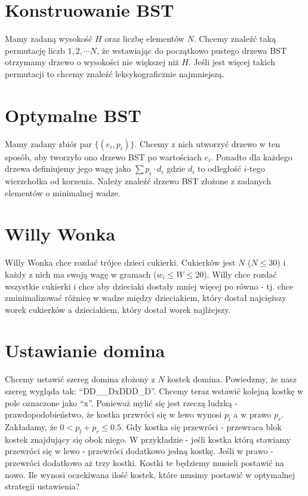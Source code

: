 \section*{Konstruowanie BST}

Mamy zadaną wysokość $H$ oraz liczbę elementów $N$.
Chcemy znaleźć taką permutację liczb $1, 2, \cdots N$, że wstawiając do początkowo pustego drzewa BST otrzymamy drzewo o wysokości nie większej niż $H$.
Jeśli jest więcej takich permutacji to chcemy znaleźć leksykograficznie najmniejszą.

\section*{Optymalne BST}

Mamy zadany zbiór par $\{(e_i, p_i)\}$.
Chcemy z nich utworzyć drzewo w ten sposób, aby tworzyło ono drzewo BST po wartościach $e_i$.
Ponadto dla każdego drzewa definiujemy jego wagę jako $\sum p_i \cdot d_i$ gdzie $d_i$ to odległość $i$-tego wierzchołka od korzenia.
Należy znaleźć drzewo BST złożone z zadanych elementów o minimalnej wadze.

\section*{Willy Wonka}

Willy Wonka chce rozdać trójce dzieci cukierki.
Cukierków jest $N$ ($N \leq 30$) i każdy z nich ma swoją wagę w gramach ($w_i \leq W \leq 20$).
Willy chce rozdać wszystkie cukierki i chce aby dzieciaki dostały mniej więcej po równo - tj. chce zminimalizować różnicę w wadze między dzieciakiem, który dostał najcięższy worek cukierków a dzieciakiem, który dostał worek najlżejszy.

\section*{Ustawianie domina}

Chcemy ustawić szereg domina złożony z $N$ kostek domina.
Powiedzmy, że nasz szereg wygląda tak: ``DD\_\_DxDDD\_D''.
Chcemy teraz wstawić kolejną kostkę w pole oznaczone jako ``x''.
Ponieważ mylić się jest rzeczą ludzką - prawdopodobieństwo, że kostka przwróci się w lewo wynosi $p_l$ a w prawo $p_r$.
Zakładamy, że $0 < p_l + p_r \leq 0.5$.
Gdy kostka się przewróci - przewraca blok kostek znajdujący się obok niego.
W przykładzie - jeśli kostka którą stawiamy przewróci się w lewo - przewróci dodatkowo jedną kostkę.
Jeśli w prawo - przewróci dodatkowo aż trzy kostki.
Kostki te będziemy musieli postawić na nowo.
Ile wynosi oczekiwana ilość kostek, które musimy postawić w optymalnej strategii ustawienia?

